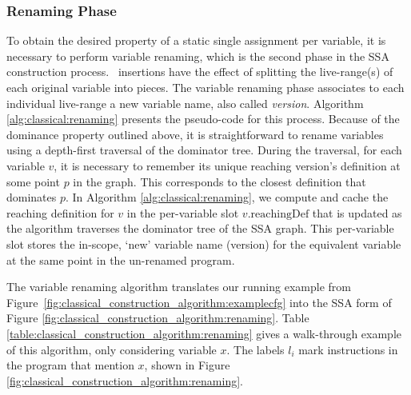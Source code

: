 \subsubsection*{Renaming Phase}
\newcommand\reachingDef[1]{#1.\mathrm{reachingDef}}
To obtain the desired property of a static single assignment per variable,
it is necessary to perform variable renaming, which
is the second phase in the SSA construction process.
\phiop\ insertions have the effect of splitting the live-range(s) of each original variable into pieces. The variable renaming phase associates to each individual live-range a new variable name, also called \emph{version}.
Algorithm \ref{alg:classical:renaming} presents the pseudo-code
for this process.
Because of the dominance property outlined above,
it is straightforward to rename variables
using a depth-first traversal of the dominator tree.
During the traversal, for each variable $v$, it is necessary to
remember its unique reaching version's definition at some point $p$ in
the graph. This corresponds to the closest definition that dominates $p$.
In Algorithm \ref{alg:classical:renaming}, we compute and cache the 
reaching definition for $v$ in the per-variable slot $\reachingDef{v}$
that is updated as the algorithm traverses the dominator tree of the
SSA graph.
This per-variable slot 
stores the in-scope, `new' variable name (version) for the equivalent
variable at the same point in the un-renamed program.

The variable renaming algorithm translates our running example 
from Figure~\ref{fig:classical_construction_algorithm:examplecfg}
into the SSA form of Figure
\ref{fig:classical_construction_algorithm:renaming}.
Table \ref{table:classical_construction_algorithm:renaming} 
gives a walk-through example of this algorithm,
only considering variable $x$. The labels $l_i$ mark
instructions in the program that mention $x$, shown in 
Figure \ref{fig:classical_construction_algorithm:renaming}.

